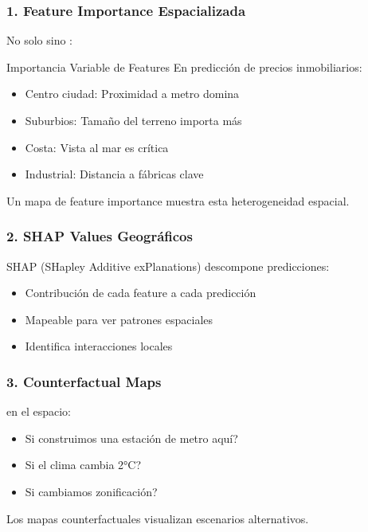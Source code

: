 \documentclass[12pt,a4paper]{article}
\begin{document}
\subsubsection{1. Feature Importance Espacializada}

No solo  sino :

\begin{ejemplo}{Importancia Variable de Features}
En predicción de precios inmobiliarios:
\begin{itemize}
    \item Centro ciudad: Proximidad a metro domina
    \item Suburbios: Tamaño del terreno importa más
    \item Costa: Vista al mar es crítica
    \item Industrial: Distancia a fábricas clave
\end{itemize}

Un mapa de feature importance muestra esta heterogeneidad espacial.
\end{ejemplo}

\subsubsection{2. SHAP Values Geográficos}

SHAP (SHapley Additive exPlanations) descompone predicciones:
\begin{itemize}
    \item Contribución de cada feature a cada predicción
    \item Mapeable para ver patrones espaciales
    \item Identifica interacciones locales
\end{itemize}

\subsubsection{3. Counterfactual Maps}

 en el espacio:
\begin{itemize}
    \item Si construimos una estación de metro aquí?
    \item Si el clima cambia 2°C?
    \item Si cambiamos zonificación?
\end{itemize}

Los mapas counterfactuales visualizan escenarios alternativos.
\end{document}
